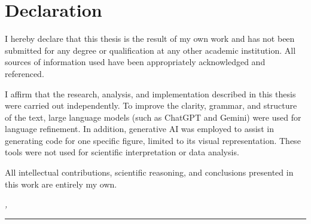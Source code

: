 %
\chapter*{Declaration}
\label{sec:declaration}
\thispagestyle{empty}

I hereby declare that this thesis is the result of my own work and has not been submitted for any degree or qualification at any other academic institution. All sources of information used have been appropriately acknowledged and referenced.

I affirm that the research, analysis, and implementation described in this thesis were carried out independently. To improve the clarity, grammar, and structure of the text, large language models (such as ChatGPT and Gemini) were used for language refinement. In addition, generative AI was employed to assist in generating code for one specific figure, limited to its visual representation. These tools were not used for scientific interpretation or data analysis.

All intellectual contributions, scientific reasoning, and conclusions presented in this work are entirely my own.

\bigskip

\noindent\textit{\thesisUniversityCity, \thesisDateSubmission}

\smallskip

\begin{flushright}
	\begin{minipage}{5cm}
		\rule{\textwidth}{1pt}
		\centering\thesisName
	\end{minipage}
\end{flushright}

